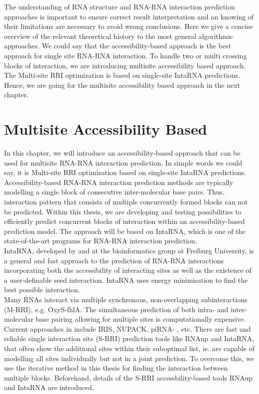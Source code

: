 \documentclass[twoside,a4paper]{report}
\begin{document}
	The understanding of RNA structure and RNA-RNA interaction prediction approaches 
	is important to ensure correct result interpretation and an knowing of their limitations are necessary to avoid wrong conclusions. Here we give a concise overview of the relevant theoretical history to the most general algorithmic approaches. We could say that the accessibility-based approach is the best approach for single site RNA-RNA interaction. To handle two or multi crossing blocks of interaction, we are introducing multisite accessibility based approach. The Multi-site RRI optimization is based on single-site IntaRNA predictions. Hence, we are going for the multisite accessibility based approach in the next chapter.\\

		
		
		
	\chapter{Multisite Accessibility Based  }
	
	In this chapter, we will introduce an accessibility-based approach that can be used for multisite RNA-RNA interaction prediction. In simple words we could say, it is Multi-site RRI optimization based on single-site IntaRNA predictions. Accessibility-based RNA-RNA interaction prediction methods are typically modelling a single block of consecutive inter-molecular base pairs. Thus, interaction pattern that consists of multiple concurrently formed blocks can not be predicted. Within this thesis, we are developing and testing possibilities to efficiently predict concurrent blocks of interaction within an accessibility-based prediction model. The approach will be based on IntaRNA, which is one of the state-of-the-art programs for RNA-RNA interaction prediction.\\
	
	IntaRNA, developed by \citep{busch2008intarna} and \citep{raden2018interactive} at the bioinformatics group at Freiburg University, is a general and fast approach to the prediction of RNA-RNA interactions incorporating both the accessibility of interacting sites as well as the existence of a user-definable seed interaction.  IntaRNA uses energy minimisation to find the best possible interaction.  \\
	
	Many RNAs interact via multiple synchronous, non-overlapping subinteractions (M-RRI), e.g. OxyS-fhlA. The simultaneous prediction of both intra- and inter-molecular base pairing allowing for multiple sites is computationally expensive. Current approaches in include IRIS, NUPACK, piRNA- , etc. There are fast and reliable single interaction site (S-RRI) prediction tools like RNAup and IntaRNA, that often show the additional sites within their suboptimal list, ie. are capable of modelling all sites individually but not in a joint prediction.	To overcome this, we use the iterative method in this thesis for finding the interaction between multiple blocks. Beforehand, details of the S-RRI accessbility-based tools RNAup and IntaRNA are introduced. \\
	
\end{document}
